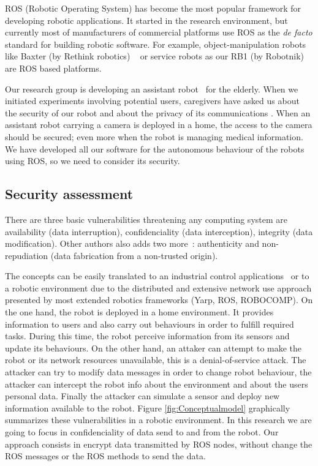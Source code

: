 \documentclass[journal,twoside]{JoPhA}
\begin{document}
ROS (Robotic Operating System) \cite{ROS09} has become the most popular framework for developing robotic applications. It started in the research environment, but currently most of manufacturers of commercial platforms use ROS as the {\em de facto} standard for building robotic software. For example, object-manipulation robots like Baxter (by Rethink robotics) ~\cite{fitzgerald2013developing} or service robots as our RB1 (by Robotnik) are ROS based platforms.

Our research group is developing an assistant robot~\cite{Martin2014} for the elderly. When we initiated experiments involving potential users, caregivers have asked us about the security of our robot and about the privacy of its communications \cite{Denning2009}. When an assistant robot carrying a camera is deployed in a home, the access to the camera should be secured; even more when the robot is managing medical information. We have developed all our software for the autonomous behaviour of the robots using ROS, so we need to consider its security.

\subsection{Security assessment}

There are three basic vulnerabilities threatening any computing system are availability (data interruption), confidenciality (data interception), integrity (data modification). Other authors also  adds two more~\cite{sattarova2007security}: authenticity and non-repudiation (data fabrication from a non-trusted origin). 


The concepts can be easily translated to an industrial control applications~\cite{huitsing2008attack} or to a robotic environment due to the distributed and extensive network use approach presented by most extended robotics frameworks (Yarp, ROS, ROBOCOMP). On the one hand, the robot is deployed in a home environment. It provides information to users and also carry out behaviours in order to fulfill required tasks. During this time, the robot perceive information from its sensors and update its behaviours. 
On the other hand, an attaker can attempt to make the robot or its network resources unavailable, this is a denial-of-service attack. The attacker can try to modify data messages in order to change robot behaviour, the attacker can intercept the robot info about the environment and about the users personal data. Finally the attacker can simulate a sensor and deploy new information available to the robot. 
Figure \ref{fig:Conceptualmodel} graphically summarizes these vulnerabilities in a robotic environment. In this research we are going to focus in confidenciality of data send to and from the robot. Our approach consists in encrypt data transmitted by ROS nodes, without change the ROS messages or the ROS methods to send the data. 
\end{document}
